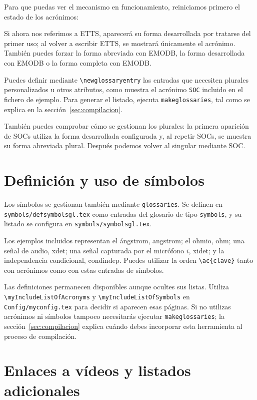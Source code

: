 Para que puedas ver el mecanismo en funcionamiento, reiniciamos primero el estado de los acrónimos:

\glsresetall[acronym]

Si ahora nos referimos a \ac{ETTS}, aparecerá su forma desarrollada por tratarse del primer uso; al volver a escribir \ac{ETTS}, se mostrará únicamente el acrónimo. También puedes forzar la forma abreviada con \acs{EMODB}, la forma desarrollada con \acl{EMODB} o la forma completa con \acf{EMODB}.

Puedes definir mediante \texttt{\textbackslash{}newglossaryentry} las entradas que necesiten plurales personalizados u otros atributos, como muestra el acrónimo \texttt{SOC} incluido en el fichero de ejemplo. Para generar el listado, ejecuta \texttt{makeglossaries}, tal como se explica en la sección~\ref{sec:compilacion}.

También puedes comprobar cómo se gestionan los plurales: la primera aparición de \acp{SOC} utiliza la forma desarrollada configurada y, al repetir \acp{SOC}, se muestra su forma abreviada plural. Después podemos volver al singular mediante \ac{SOC}.

\section{Definición y uso de símbolos}
\label{sec:simbolos}

Los símbolos se gestionan también mediante \texttt{glossaries}. Se definen en \texttt{symbols/defsymbolsgl.tex} como entradas del glosario de tipo \texttt{symbols}, y su listado se configura en \texttt{symbols/symbolsgl.tex}.

Los ejemplos incluidos representan el ángstrom, \ac{angstrom}; el ohmio, \ac{ohm}; una señal de audio, \ac{xdet}; una señal capturada por el micrófono \(i\), \ac{xidet}; y la independencia condicional, \ac{condindep}. Puedes utilizar la orden \texttt{\textbackslash{}ac\{clave\}} tanto con acrónimos como con estas entradas de símbolos.

Las definiciones permanecen disponibles aunque ocultes sus listas. Utiliza \texttt{\textbackslash{}myIncludeListOfAcronyms} y \texttt{\textbackslash{}myIncludeListOfSymbols} en \texttt{Config/myconfig.tex} para decidir si aparecen esas páginas. Si no utilizas acrónimos ni símbolos tampoco necesitarás ejecutar \texttt{makeglossaries}; la sección~\ref{sec:compilacion} explica cuándo debes incorporar esta herramienta al proceso de compilación.

\section{Enlaces a vídeos y listados adicionales}
\label{sec:intro-videolink}

